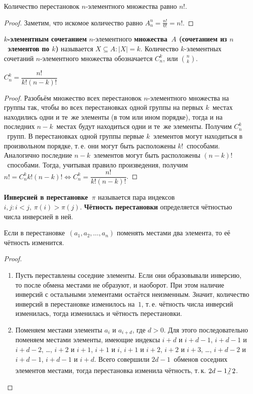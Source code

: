 \begin{consequent}
Количество перестановок $n$-элементного множества равно $n!$.
\end{consequent}
\begin{proof}
Заметим, что искомое количество равно $A_n^n = \frac{n!}{0!} = n!$.
\end{proof}

 \textbf{$k$-элементным сочетанием} $n$-элементного \textbf{множества~$A$ (сочетанием из $n$~элементов по $k$)} называется $X \subseteq A \colon |X| = k$.
Количество $k$-элементных сочетаний $n$-элементного множества обозначается $C_n^k$, или $\binom{n}{k}$.

\begin{statement}
$C_n^k = \dfrac{n!}{k! (n - k)!}$
\end{statement}
\begin{proof}
Разобьём множество всех перестановок $n$-элементного множества на группы так, чтобы во всех перестановках одной группы на первых $k$~местах находились одни и те~же элементы (в том или ином порядке), тогда и на последних $n - k$~местах будут находиться одни и те~же элементы.
Получим $C_n^k$~групп.
В перестановках одной группы первые $k$~элементов могут находиться в произвольном порядке, т.\,е. они могут быть расположены $k!$~способами.
Аналогично последние $n - k$~элементов могут быть расположены $(n - k)!$~способами.
Тогда, учитывая правило произведения, получим $n! = C_n^k k! (n - k)! \Leftrightarrow C_n^k = \dfrac{n!}{k! (n - k)!}$.
\end{proof}

 \textbf{Инверсией в перестановке~$\pi$} называется пара индексов $i, j \colon i < j, \ \pi(i) > \pi(j)$.
\textbf{Чётность перестановки} определяется чётностью числа инверсией в ней.

\begin{statement}
\label{st:parity_of_permutation}
Если в перестановке~$(a_1, a_2, \ldots, a_n)$ поменять местами два элемента, то её чётность изменится.
\end{statement}
\begin{proof}
\begin{enumerate}
	\item Пусть переставлены соседние элементы.
	Если они образовывали инверсию, то после обмена местами не образуют, и наоборот.
	При этом наличие инверсий с остальными элементами остаётся неизменным.
	Значит, количество инверсий в перестановке изменилось на~$1$, т.\,е. чётность числа инверсий изменилась, тогда изменилась и чётность перестановки.
	
	\item Поменяем местами элементы $a_i$ и $a_{i+d}$, где $d > 0$.
	Для этого последовательно поменяем местами элементы, имеющие индексы $i+d$ и $i+d-1$, $i+d-1$ и $i+d-2$, \ldots, $i+2$ и $i+1$, $i+1$ и $i$, $i+1$ и $i+2$, $i+2$ и $i+3$, \ldots, $i+d-2$ и $i+d-1$, $i+d-1$ и $i+d$.
	Всего совершили $2d - 1$~обменов соседних элементов местами, тогда перестановка изменила чётность, т.\,к. $2d - 1 \notmult 2$.
\end{enumerate}
\end{proof}